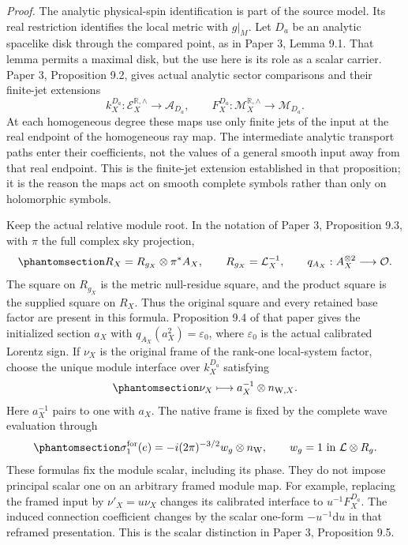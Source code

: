 \documentclass[
  english,
  11pt,
  reqno]{amsart}
\begin{document}
\emph{Proof.} The analytic physical-spin identification is part of the
source model. Its real restriction identifies the local metric with
\(g|_M\). Let \(D_a\) be an analytic spacelike disk through the compared
point, as in Paper 3, Lemma 9.1. That lemma permits a maximal disk, but
the use here is its role as a scalar carrier. Paper 3, Proposition 9.2,
gives actual analytic sector comparisons and their finite-jet extensions
\[
k_X^{D_a}:\mathscr E_X^{\mathbb R,\wedge}
 \longrightarrow\mathcal A_{D_a},
\qquad
F_X^{D_a}:\mathscr M_X^{\mathbb R,\wedge}
 \longrightarrow\mathcal M_{D_a}.
\] At each homogeneous degree these maps use only finite jets of the
input at the real endpoint of the homogeneous ray map. The intermediate
analytic transport paths enter their coefficients, not the values of a
general smooth input away from that real endpoint. This is the
finite-jet extension established in that proposition; it is the reason
the maps act on smooth complete symbols rather than only on holomorphic
symbols.

Keep the actual relative module root. In the notation of Paper 3,
Proposition 9.3, with \(\pi\) the full complex sky projection,
\begin{equation}\protect\phantomsection\label{eq:analytic-bridge-relative-root}{
R_X=R_{g_X}\otimes\pi^*A_X,
\qquad R_{g_X}=\mathcal L_X^{-1},
\qquad q_{A_X}:A_X^{\otimes2}\longrightarrow\mathcal O.
}\end{equation} The square on \(R_{g_X}\) is the metric null-residue
square, and the product square is the supplied square on \(R_X\). Thus
the original square and every retained base factor are present in this
formula. Proposition 9.4 of that paper gives the initialized section
\(a_X\) with \(q_{A_X}(a_X^2)=\varepsilon_0\), where \(\varepsilon_0\)
is the actual calibrated Lorentz sign. If \(\nu_X\) is the original
frame of the rank-one local-system factor, choose the unique module
interface over \(k_X^{D_a}\) satisfying
\begin{equation}\protect\phantomsection\label{eq:analytic-global-interface-framing}{
\nu_X\longmapsto a_X^{-1}\otimes n_{\mathrm W,X}.
}\end{equation} Here \(a_X^{-1}\) pairs to one with \(a_X\). The native
frame is fixed by the complete wave evaluation through
\begin{equation}\protect\phantomsection\label{eq:analytic-bridge-native-leading-frame}{
\sigma^{\mathrm{for}}_1(e)
 =-i(2\pi)^{-3/2}w_g\otimes n_{\mathrm W},
\qquad w_g=1\text{ in }\mathcal L\otimes R_g.
}\end{equation} These formulas fix the module scalar, including its
phase. They do not impose principal scalar one on an arbitrary framed
module map. For example, replacing the framed input by \(\nu'_X=u\nu_X\)
changes its calibrated interface to \(u^{-1}F_X^{D_a}\). The induced
connection coefficient changes by the scalar one-form
\(-u^{-1}\mathrm du\) in that reframed presentation. This is the scalar
distinction in Paper 3, Proposition 9.5.
\end{document}
